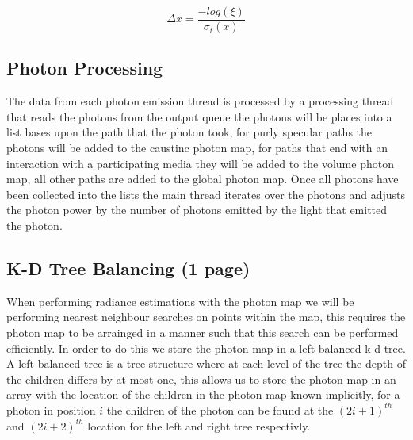 \begin{equation}
\Delta x = \frac{-log(\xi)}{\sigma_t(x)}
\label{eq:volum_dist_importance}
\end{equation}

\subsection{Photon Processing}
The data from each photon emission thread is processed by a processing thread that reads the photons from the output queue
the photons will be places into a list bases upon the path that the photon took, for purly specular paths the photons
will be added to the caustinc photon map, for paths that end with an interaction with a participating media they will be
added to the volume photon map, all other paths are added to the global photon map. Once all photons have been collected
into the lists the main thread iterates over the photons and adjusts the photon power by the number of photons emitted by
the light that emitted the photon. 

\subsection{K-D Tree Balancing (1 page)}
When performing radiance estimations with the photon map we will be performing nearest neighbour searches on points within
the map, this requires the photon map to be arrainged in a manner such that this search can be performed efficiently.
In order to do this we store the photon map in a left-balanced k-d tree. A left balanced tree is a tree structure where
at each level of the tree the depth of the children differs by at most one, 
this allows us to store the photon map in an array with the location of the children in the photon map known implicitly,
for a photon in position $i$ the children of the photon can be found at the $(2i + 1)^{th}$ and $(2i + 2)^{th}$
location for the left and right tree respectivly.


